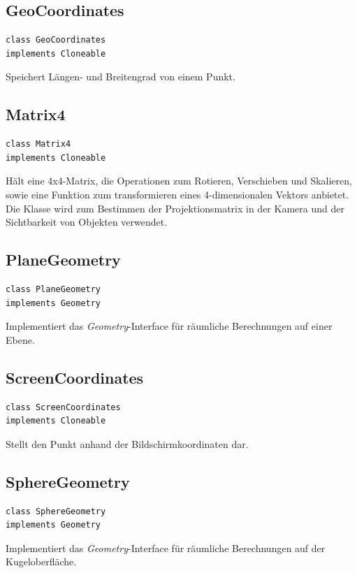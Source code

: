 \documentclass[10pt]{scrreprt}
\begin{document}
\subsection*{GeoCoordinates}
\begin{lstlisting}
class GeoCoordinates
implements Cloneable
\end{lstlisting}
Speichert Längen- und Breitengrad von einem Punkt.\\

\vspace{5mm}
\subsection*{Matrix4}
\begin{lstlisting}
class Matrix4
implements Cloneable
\end{lstlisting}
Hält eine 4x4-Matrix, die Operationen zum Rotieren, Verschieben und Skalieren, sowie eine Funktion zum transformieren eines 4-dimensionalen Vektors anbietet. Die Klasse wird zum Bestimmen der Projektionsmatrix in der Kamera und der Sichtbarkeit von Objekten verwendet.\\

\vspace{5mm}
\subsection*{PlaneGeometry}
\begin{lstlisting}
class PlaneGeometry
implements Geometry
\end{lstlisting}
Implementiert das \textit{Geometry}-Interface für räumliche Berechnungen auf einer Ebene.\\

\vspace{5mm}
\subsection*{ScreenCoordinates}
\begin{lstlisting}
class ScreenCoordinates
implements Cloneable
\end{lstlisting}
Stellt den Punkt anhand der Bildschirmkoordinaten dar.\\

\vspace{5mm}
\subsection*{SphereGeometry}
\begin{lstlisting}
class SphereGeometry
implements Geometry
\end{lstlisting}
Implementiert das \textit{Geometry}-Interface für räumliche Berechnungen auf der Kugeloberfläche.\\
\end{document}
